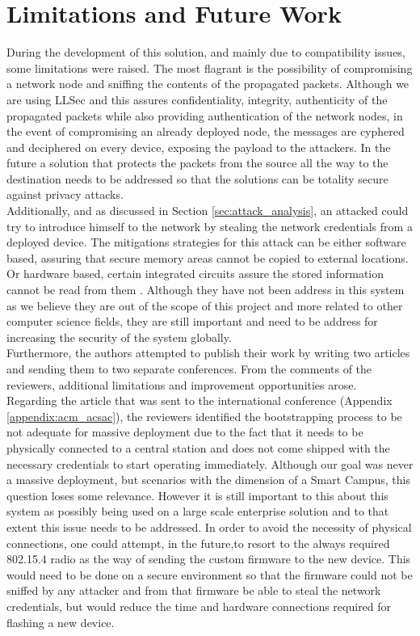 
\chapter{Limitations and Future Work}
\label{chapter:limitations-future-work}

During the development of this solution, and mainly due to compatibility issues, some limitations were raised. The most flagrant is the possibility of compromising a network node and sniffing the contents of the propagated packets. Although we are using \gls{LLSec} and this assures confidentiality, integrity, authenticity of the propagated packets while also providing authentication of the network nodes, in the event of compromising an already deployed node, the messages are cyphered and deciphered on every device, exposing the payload to the attackers. In the future a solution that protects the packets from the source all the way to the destination needs to be addressed so that the solutions can be totality secure against privacy attacks.\\
Additionally, and as discussed in Section \ref{sec:attack_analysis}, an attacked could try to introduce himself to the network by stealing the network credentials from a deployed device. The mitigations strategies for this attack can be either software based,  assuring that secure memory areas cannot be copied to external locations. Or hardware based, certain integrated circuits assure the stored information cannot be read from them \cite{Lesjak2014}. Although they have not been address in this system as we believe they are out of the scope of this project and more related to other computer science fields, they are still important and need to be address for increasing the security of the system globally.\\
Furthermore, the authors attempted to publish their work by writing two articles and sending them to two separate conferences. From the comments of the reviewers, additional limitations and improvement opportunities arose.\\
Regarding the article that was sent to the international conference (Appendix  \ref{appendix:acm_acsac}), the reviewers identified the bootstrapping process to be not adequate for massive deployment due to the fact that it needs to be physically connected to a central station and does not come shipped with the necessary credentials to start operating immediately. Although our goal was never a massive deployment, but scenarios with the dimension of a Smart Campus, this question loses some relevance. However it is still important to this about this system as possibly being used on a large scale enterprise solution and to that extent this issue needs to be addressed. In order to avoid the necessity of physical connections, one could attempt, in the future,to resort to the always required 802.15.4 radio as the way of sending the custom firmware to the new device. This would need to be done on a secure environment so that the firmware could not be sniffed by any attacker and from that firmware be able to steal the network credentials, but would reduce the time and hardware connections required for flashing a new device.\\
